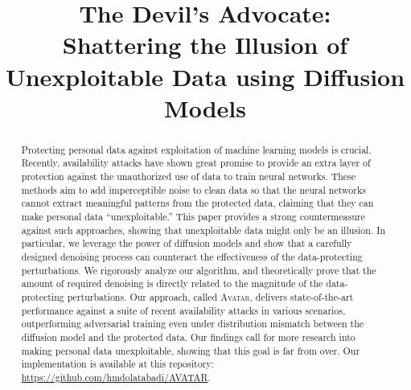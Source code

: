 \documentclass[conference]{IEEEtran}
\theoremstyle{definition}
\theoremstyle{remark}
\theoremstyle{proposition}
\begin{document}

\title{The Devil's Advocate:\\Shattering the Illusion of Unexploitable Data using Diffusion Models}

\author{
}

\maketitle

\begin{abstract}
   Protecting personal data against exploitation of machine learning models is crucial.
   Recently, availability attacks have shown great promise to provide an extra layer of protection against the unauthorized use of data to train neural networks.
   These methods aim to add imperceptible noise to clean data so that the neural networks cannot extract meaningful patterns from the protected data, claiming that they can make personal data ``unexploitable.''
   This paper provides a strong countermeasure against such approaches, showing that unexploitable data might only be an illusion.
   In particular, we leverage the power of diffusion models and show that a carefully designed denoising process can counteract the effectiveness of the data-protecting perturbations.
   We rigorously analyze our algorithm, and theoretically prove that the amount of required denoising is directly related to the magnitude of the data-protecting perturbations.
   Our approach, called \textsc{Avatar}, delivers state-of-the-art performance against a suite of recent availability attacks in various scenarios, outperforming adversarial training even under distribution mismatch between the diffusion model and the protected data.
   Our findings call for more research into making personal data unexploitable, showing that this goal is far from over.
   Our implementation is available at this repository: \url{https://github.com/hmdolatabadi/AVATAR}.
\end{abstract}
\end{document}
